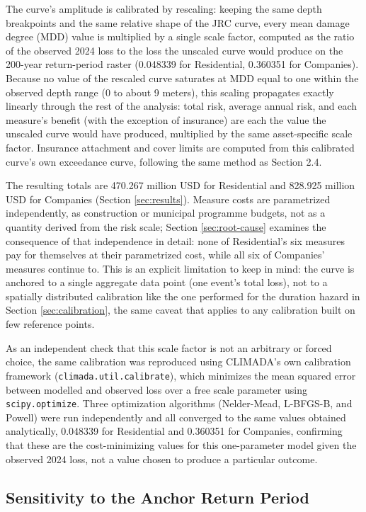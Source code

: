 \documentclass[11pt]{article}
\begin{document}
The curve's amplitude is calibrated by rescaling: keeping the same depth breakpoints and
the same relative shape of the JRC curve, every mean damage degree (MDD) value is
multiplied by a single scale factor, computed as the ratio of the observed 2024 loss to the
loss the unscaled curve would produce on the 200-year return-period raster (0.048339 for
Residential, 0.360351 for Companies). Because no value of the rescaled curve saturates at
MDD equal to one within the observed depth range (0 to about 9 meters), this scaling
propagates exactly linearly through the rest of the analysis: total risk, average annual
risk, and each measure's benefit (with the exception of insurance) are each the value the
unscaled curve would have produced, multiplied by the same asset-specific scale factor.
Insurance attachment and cover limits are computed from this calibrated curve's own
exceedance curve, following the same method as Section 2.4.

The resulting totals are 470.267 million USD for Residential and 828.925 million USD for
Companies (Section \ref{sec:results}). Measure costs are parametrized independently, as
construction or municipal programme budgets, not as a quantity derived from the risk scale;
Section \ref{sec:root-cause} examines the consequence of that independence in detail: none
of Residential's six measures pay for themselves at their parametrized cost, while all six
of Companies' measures continue to. This is an explicit limitation to keep in mind: the
curve is anchored to a single aggregate data point (one event's total loss), not to a
spatially distributed calibration like the one performed for the duration hazard in Section \ref{sec:calibration}, the same caveat that applies to any calibration built on few reference points.

As an independent check that this scale factor is not an arbitrary or forced choice, the
same calibration was reproduced using CLIMADA's own calibration framework
(\texttt{climada.util.calibrate}), which minimizes the mean squared error between modelled
and observed loss over a free scale parameter using \texttt{scipy.optimize}. Three
optimization algorithms (Nelder-Mead, L-BFGS-B, and Powell) were run independently and all
converged to the same values obtained analytically, 0.048339 for Residential and 0.360351
for Companies, confirming that these are the cost-minimizing values for this one-parameter
model given the observed 2024 loss, not a value chosen to produce a particular outcome.

\subsection{Sensitivity to the Anchor Return Period}
\label{sec:sensitivity}
\end{document}
